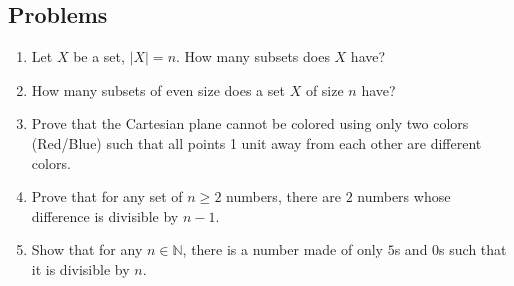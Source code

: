 \newpage
\begin{mdframed}
\section*{Problems}
\begin{enumerate}
    \item Let $X$ be a set, $|X| = n$. How many subsets does $X$ have? 

    \item How many subsets of even size does a set $X$ of size $n$ have?

    \item Prove that the Cartesian plane cannot be colored using only two colors (Red/Blue) such that all points 1 unit away from each other are different colors. 

    \item Prove that for any set of $n \geq 2$ numbers, there are $2$ numbers whose difference is divisible by $n - 1$. 

    \item Show that for any $n \in \mathbb{N}$, there is a number made of only $5$s and $0$s such that it is divisible by $n$.  
\end{enumerate}
\end{mdframed}

